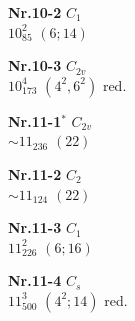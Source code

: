 \documentclass[12pt]{article}
\begin{document}
{\begin{minipage}[t]{3.5cm}
\par
{{\bf Nr.10-2} \quad $C_{1}$\\ $10^2_{85}$ \quad $(6;14)$\\\vspace{3mm} }
\end{minipage}
\setlength{\unitlength}{1cm}
\begin{minipage}[t]{3.5cm}
\centering
\epsfxsize=2.5cm
\par
{{\bf Nr.10-3} \quad $C_{2v}$\\ $10^4_{173}$ \quad $(4^2,6^2)$ red.\\\vspace{3mm} }
\end{minipage}
\setlength{\unitlength}{1cm}
\begin{minipage}[t]{3.5cm}
\centering
\epsfxsize=2.5cm
\par
{{\bf Nr.11-1${}^*$} \quad $C_{2v}$\\ $\sim 11_{236}$ \quad $(22)$\\\vspace{3mm} }
\end{minipage}
\setlength{\unitlength}{1cm}
\begin{minipage}[t]{3.5cm}
\centering
\epsfxsize=2.5cm
\par
{{\bf Nr.11-2} \quad $C_{2}$\\ $\sim 11_{124}$ \quad $(22)$\\\vspace{3mm} }
\end{minipage}
\setlength{\unitlength}{1cm}
\begin{minipage}[t]{3.5cm}
\centering
\epsfxsize=2.5cm
\par
{{\bf Nr.11-3} \quad $C_{1}$\\ $11^2_{226}$ \quad $(6;16)$\\\vspace{3mm} }
\end{minipage}
\setlength{\unitlength}{1cm}
\begin{minipage}[t]{3.5cm}
\centering
\epsfxsize=2.5cm
\par
{{\bf Nr.11-4} \quad $C_{s}$\\ $11^3_{500}$ \quad $(4^2;14)$ red.\\\vspace{3mm} }
\end{minipage}
\setlength{\unitlength}{1cm}
}
\end{document}
